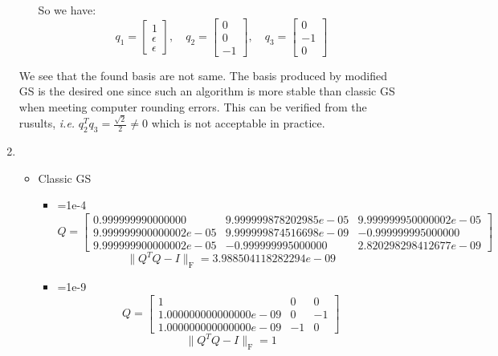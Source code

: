 \documentclass[english,onecolumn]{IEEEtran}
\begin{document}
\begin{enumerate}
\begin{itemize}
   	So we have:
   	$$q_1=\begin{bmatrix}  1 \\ \epsilon \\ \epsilon \end{bmatrix},\quad q_2 = \begin{bmatrix}  0 \\ 0 \\ -1\end{bmatrix},\quad q_3=\begin{bmatrix}  0 \\ -1 \\ 0 \end{bmatrix}$$
   	   	\end{itemize} 
   We see that the found basis are not same. The basis produced by modified GS is the desired one since such an algorithm is more stable than classic GS when meeting computer rounding errors. This can be verified from the rusults, \textit{i.e.} $q_2^Tq_3=\frac{\sqrt{2}}{2}\ne 0$ which is not acceptable in practice.
   \item \begin{itemize}
 	\item Classic GS
 	\begin{itemize}
 		\item \epsilon=1e-4
 		$$Q = \begin{bmatrix}
 			0.999999990000000 & 9.999999878202985e-05 & 9.999999950000002e-05\\
 			9.999999900000002e-05 & 9.999999874516698e-09 & -0.999999995000000\\
 			9.999999900000002e-05 & -0.999999995000000 & 2.820298298412677e-09
 		\end{bmatrix}$$
 	    $$\|Q^T  Q - I\|_{\text{F}}=3.988504118282294e-09$$
 		    \item \epsilon=1e-9
    $$Q=\begin{bmatrix}
    1 & 0 & 0\\
    1.000000000000000e-09 & 0 & -1\\
    1.000000000000000e-09 & -1 & 0
    \end{bmatrix}$$
    $$\|Q^T  Q - I\|_{\text{F}}=1$$
 	\end{itemize}


\end{itemize}
\end{enumerate}
\end{document}

